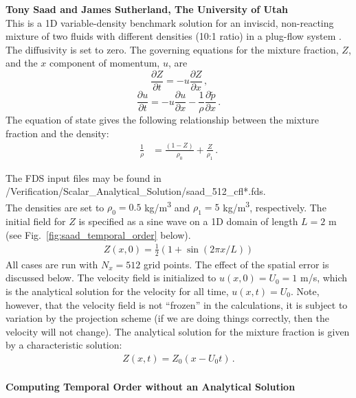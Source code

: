 \documentclass[11pt]{book}
\begin{document}
\textbf{Tony Saad and James Sutherland, The University of Utah}\\

\noindent This is a 1D variable-density benchmark solution for an inviscid, non-reacting mixture of two fluids with different densities (10:1 ratio) in a plug-flow system \cite{Biglari:2013}.  The diffusivity is set to zero.  The governing equations for the mixture fraction, $Z$, and the $x$ component of momentum, $u$, are
\begin{equation}
\frac{\partial Z}{\partial t} = - u\frac{\partial Z}{\partial x} \,\mbox{,}
\end{equation}
\begin{equation}
\frac{\partial u}{\partial t} = - u\frac{\partial u}{\partial x} - \frac{1}{\rho} \frac{\partial \tilde{p}}{\partial x} \,\mbox{.}
\end{equation}
The equation of state gives the following relationship between the mixture fraction and the density:
\begin{align}
\frac{1}{\rho} &= \frac{(1-Z)}{\rho_0} + \frac{Z}{\rho_1} \,\mbox{.}
\end{align}

The FDS input files may be found in\\
{\ct /Verification/Scalar\_Analytical\_Solution/saad\_512\_cfl*.fds}.\\

\noindent The densities are set to $\rho_0 = 0.5$ \si{kg/m^3} and $\rho_1 = 5$ \si{kg/m^3}, respectively.  The initial field for $Z$ is specified as a sine wave on a 1D domain of length $L=2$ m (see Fig.~\ref{fig:saad_temporal_order} below).
\begin{align}
Z(x,0) = \frac{1}{2}\left( 1 + \sin(2\pi x/L) \right)
\end{align}
All cases are run with $N_x = 512$ grid points.  The effect of the spatial error is discussed below. The velocity field is initialized to $u(x,0) = U_0 = 1$ m/s, which is the analytical solution for the velocity for all time, $u(x,t) = U_0$.  Note, however, that the velocity field is not ``frozen'' in the calculations, it is subject to variation by the projection scheme (if we are doing things correctly, then the velocity will not change).  The analytical solution for the mixture fraction is given by a characteristic solution:
\begin{align}
Z(x,t) = Z_0(x-U_0 t) \,\mbox{.}
\end{align}

\paragraph{Computing Temporal Order without an Analytical Solution}
\end{document}
